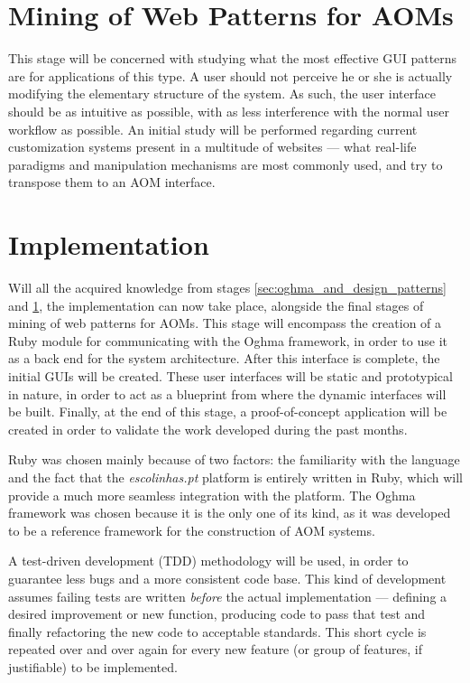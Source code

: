 \section{Mining of Web Patterns for AOMs}\label{sec:mining_of_web_patterns}

This stage will be concerned with studying what the most effective GUI patterns are for applications of this type. A user should not perceive he or she is actually modifying the elementary structure of the system. As such, the user interface should be as intuitive as possible, with as less interference with the normal user workflow as possible. An initial study will be performed regarding current customization systems present in a multitude of websites --- what real-life paradigms and manipulation mechanisms are most commonly used, and try to transpose them to an AOM interface.

\section{Implementation}\label{sec:implementation}

Will all the acquired knowledge from stages \ref{sec:oghma_and_design_patterns} and \ref{sec:mining_of_web_patterns}, the implementation can now take place, alongside the final stages of mining of web patterns for AOMs. This stage will encompass the creation of a Ruby module for communicating with the Oghma framework, in order to use it as a back end for the system architecture. After this interface is complete, the initial GUIs will be created. These user interfaces will be static and prototypical in nature, in order to act as a blueprint from where the dynamic interfaces will be built. Finally, at the end of this stage, a proof-of-concept application will be created in order to validate the work developed during the past months.

Ruby was chosen mainly because of two factors: the familiarity with the language and the fact that the \textit{escolinhas.pt} platform is entirely written in Ruby, which will provide a much more seamless integration with the platform. The Oghma framework was chosen because it is the only one of its kind, as it was developed to be a reference framework for the construction of AOM systems. 

A test-driven development (TDD) methodology will be used, in order to guarantee less bugs and a more consistent code base. This kind of development assumes failing tests are written \emph{before} the actual implementation --- defining a desired improvement or new function, producing code to pass that test and finally refactoring the new code to acceptable standards. This short cycle is repeated over and over again for every new feature (or group of features, if justifiable) to be implemented.

